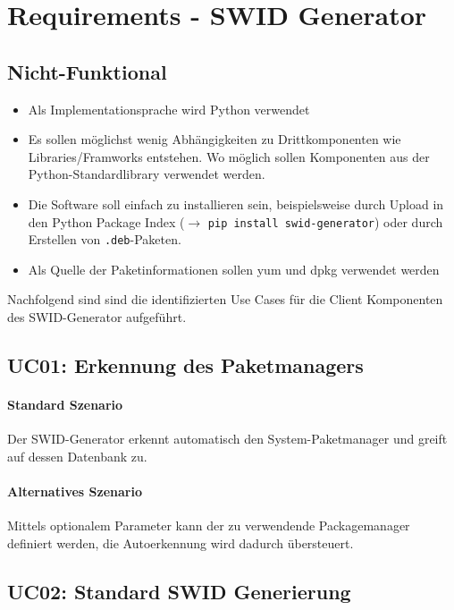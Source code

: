 \section{Requirements - SWID Generator}

\subsection{Nicht-Funktional}

\begin{itemize}
    \item Als Implementationsprache wird Python verwendet
    \item Es sollen möglichst wenig Abhängigkeiten zu Drittkomponenten wie
			Libraries/Framworks entstehen. Wo möglich sollen Komponenten aus der
			Python-Standardlibrary verwendet werden.
    \item Die Software soll einfach zu installieren sein, beispielsweise durch
			Upload in den Python Package Index ($\rightarrow$ \texttt{pip install
			swid-generator}) oder durch Erstellen von \texttt{.deb}-Paketen.
    \item Als Quelle der Paketinformationen sollen yum und dpkg verwendet werden
\end{itemize}

Nachfolgend sind sind die identifizierten Use Cases für die Client Komponenten des SWID-Generator aufgeführt.

\subsection{UC01: Erkennung des Paketmanagers}

\paragraph{Standard Szenario}
Der SWID-Generator erkennt automatisch den System-Paketmanager und greift auf
dessen Datenbank zu.

\paragraph{Alternatives Szenario}
Mittels optionalem Parameter kann der zu verwendende Packagemanager definiert
werden, die Autoerkennung wird dadurch übersteuert.

\subsection{UC02: Standard SWID Generierung}

